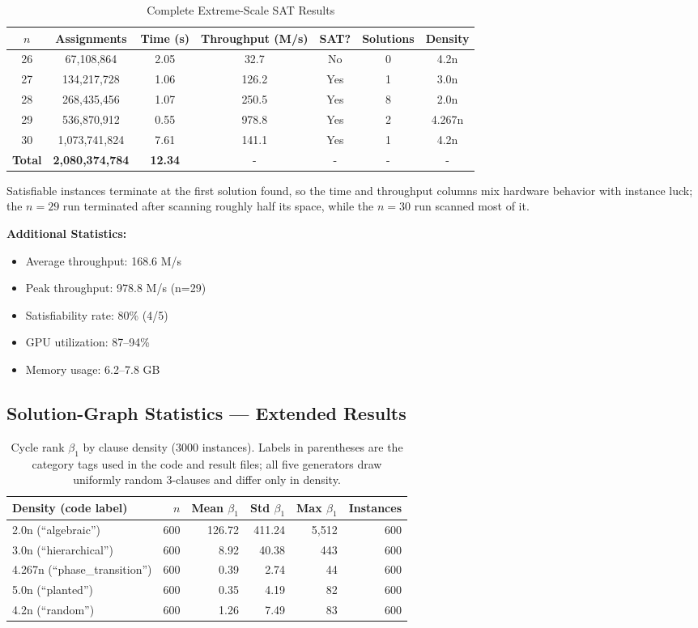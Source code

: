 \documentclass[11pt]{article}
\begin{document}
\begin{table}[h]
\centering
\caption{Complete Extreme-Scale SAT Results}
\begin{tabular}{ccccccc}
\toprule
$n$ & Assignments & Time (s) & Throughput (M/s) & SAT? & Solutions & Density \\
\midrule
26 & 67,108,864 & 2.05 & 32.7 & No & 0 & 4.2n \\
27 & 134,217,728 & 1.06 & 126.2 & Yes & 1 & 3.0n \\
28 & 268,435,456 & 1.07 & 250.5 & Yes & 8 & 2.0n \\
29 & 536,870,912 & 0.55 & 978.8 & Yes & 2 & 4.267n \\
30 & 1,073,741,824 & 7.61 & 141.1 & Yes & 1 & 4.2n \\
\midrule
\textbf{Total} & \textbf{2,080,374,784} & \textbf{12.34} & - & - & - & - \\
\bottomrule
\end{tabular}
\end{table}

Satisfiable instances terminate at the first solution found, so the time and
throughput columns mix hardware behavior with instance luck; the $n=29$ run
terminated after scanning roughly half its space, while the $n=30$ run
scanned most of it.

\textbf{Additional Statistics:}
\begin{itemize}
\item Average throughput: 168.6 M/s
\item Peak throughput: 978.8 M/s (n=29)
\item Satisfiability rate: 80\% (4/5)
\item GPU utilization: 87--94\%
\item Memory usage: 6.2--7.8 GB
\end{itemize}

\subsection{Solution-Graph Statistics --- Extended Results}

\begin{table}[h]
\centering
\caption{Cycle rank $\beta_1$ by clause density (3000 instances). Labels in
parentheses are the category tags used in the code and result files; all five
generators draw uniformly random 3-clauses and differ only in density.}
\begin{tabular}{lrrrrr}
\toprule
Density (code label) & $n$ & Mean $\beta_1$ & Std $\beta_1$ & Max $\beta_1$ & Instances \\
\midrule
2.0n (``algebraic'') & 600 & 126.72 & 411.24 & 5,512 & 600 \\
3.0n (``hierarchical'') & 600 & 8.92 & 40.38 & 443 & 600 \\
4.267n (``phase\_transition'') & 600 & 0.39 & 2.74 & 44 & 600 \\
5.0n (``planted'') & 600 & 0.35 & 4.19 & 82 & 600 \\
4.2n (``random'') & 600 & 1.26 & 7.49 & 83 & 600 \\
\bottomrule
\end{tabular}
\end{table}
\end{document}
